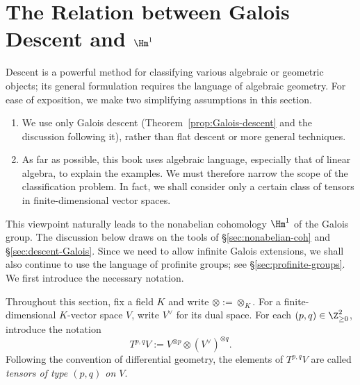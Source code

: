 
\section{The Relation between Galois Descent and
\texorpdfstring{$\Hm^1$}{H1}}\label{sec:Galois-H1}
\hypertarget{o014.aljabr2.chapter7.galois-descent-h1}{ }
Descent is a powerful method for classifying various algebraic or geometric
objects; its general formulation requires the language of algebraic geometry.
For ease of exposition, we make two simplifying assumptions in this section.
\begin{enumerate}
	\item We use only Galois descent
	(Theorem~\ref{prop:Galois-descent} and the discussion following it), rather
	than flat descent or more general techniques.
	\item As far as possible, this book uses algebraic language, especially that
	of linear algebra, to explain the examples. We must therefore narrow the
	scope of the classification problem. In fact, we shall consider only a
	certain class of tensors in finite-dimensional vector spaces.
\end{enumerate}

This viewpoint naturally leads to the nonabelian cohomology $\Hm^1$ of the
Galois group. The discussion below draws on the tools of
\S\ref{sec:nonabelian-coh} and \S\ref{sec:descent-Galois}. Since we need to
allow infinite Galois extensions, we shall also continue to use the language
of profinite groups; see \S\ref{sec:profinite-groups}. We first introduce the
necessary notation.

\begin{convention}
	Throughout this section, fix a field $K$ and write
	$\otimes:=\otimes_K$. For a finite-dimensional $K$-vector space $V$, write
	$V^\vee$ for its dual space. For each $(p,q)\in\Z_{\geq0}^2$, introduce the
	notation
	\[
	T^{p,q}V:=V^{\otimes p}\otimes(V^\vee)^{\otimes q}.
	\]
	Following the convention of differential geometry, the elements of
	$T^{p,q}V$ are called \emph{tensors of type $(p,q)$ on $V$}.
\end{convention}

